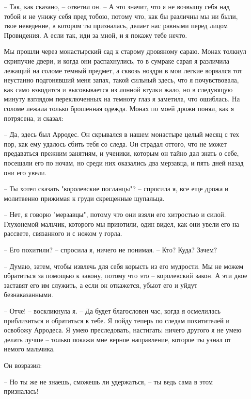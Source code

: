-- Так, как сказано, -- ответил он. -- А это значит, что я  не  возвышу
себя над тобой и не унижу себя пред тобою, потому что, как бы различны мы ни
были,  твое  неведение,  в  котором  ты призналась, делает нас равными перед
лицом Провидения. А если так, иди за мной, и я покажу тебе нечто.

Мы прошли через монастырский  сад  к  старому  дровяному  сараю.  Монах
толкнул  скрипучие  двери,  и  когда  они распахнулись, то в сумраке сарая я
различила лежащий на соломе темный предмет, а сквозь  ноздри  в  мои  легкие
ворвался  тот  неустанно  подгонявший меня запах, такой сильный здесь, что я
почувствовала, как само взводится и высовывается из лонной втулки жало, но в
следующую минуту взглядом переключенных на  темноту  глаз  я  заметила,  что
ошиблась.  На  соломе  лежала  только  брошенная одежда. Монах по моей дрожи
понял, как я потрясена, и сказал:

-- Да, здесь был Арродес. Он скрывался в нашем монастыре целый месяц  с
тех  пор,  как  ему  удалось  сбить тебя со следа. Он страдал оттого, что не
может предаваться прежним занятиям, и ученики, которым он тайно дал знать  о
себе,  посещали  его  по  ночам, но среди них оказались два мерзавца, и пять
дней назад они его увели.

-- Ты хотел сказать "королевские посланцы"?  --  спросила  я,  все  еще
дрожа и молитвенно прижимая к груди скрещенные щупальца.

-- Нет,  я  говорю  "мерзавцы",  потому  что  они взяли его хитростью и
силой. Глухонемой мальчик, которого мы приютили, один видел, как  они  увели
его на рассвете, связанного и с ножом у горла.

-- Его похитили? -- спросила я, ничего не понимая. -- Кто? Куда? Зачем?

-- Думаю, затем, чтобы извлечь для себя корысть из его мудрости. Мы  не
можем обратиться за помощью к закону, потому что это -- королевский закон. А
эти  двое  заставят  его  им служить, а если он откажется, убьют его и уйдут
безнаказанными.

-- Отче! -- воскликнула  я.  --  Да  будет  благословен  час,  когда  я
осмелилась  приблизиться  и  обратиться  к  тебе.  Я  пойду теперь по следам
похитителей и освобожу Арродеса.  Я  умею  преследовать,  настигать:  ничего
другого  я  не  умею  делать  лучше -- только покажи мне верное направление,
которое ты узнал от немого мальчика.

Он возразил:

-- Но ты же не знаешь, сможешь ли удержаться, -- ты ведь  сама  в  этом
призналась!

